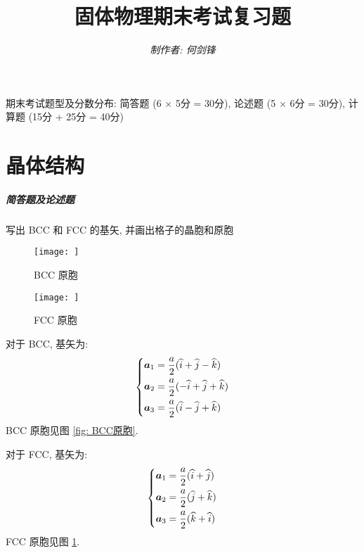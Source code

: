 \documentclass[UTF8]{ctexart}
\title{\bfseries 固体物理期末考试复习题}
\author{\slshape 制作者: 何剑锋}
\date{}
\newenvironment{Answer}{}{}
\begin{document}
\maketitle

\hspace*{2em}期末考试题型及分数分布: 简答题 (6 $\times$ 5分 = 30分), 论述题 (5 $\times$ 6分 = 30分), 计算题 (15分 + 25分 = 40分)

\section{晶体结构}
    \subparagraph{简答题及论述题}
        \begin{Question}
            \item 写出 BCC 和 FCC 的基矢, 并画出格子的晶胞和原胞

\begin{Answer}
    \begin{Solve}[Solve:]
        \begin{figure}
            \centering
            \parbox[t]{.49\textwidth}{
                \centering
                \texttt{[image: ]}
                \caption{BCC 原胞}\label{fig: BCC原胞}
            }
            \parbox[t]{.49\textwidth}{
                \centering
                \texttt{[image: ]}
                \caption{FCC 原胞}\label{fig: FCC原胞}
            }
        \end{figure}

        \hspace*{2em}对于 BCC, 基矢为:
            \begin{equation*}
                \begin{dcases}
                    \bm{a}_1 = \dfrac{a}{2} (\widehat{i} + \widehat{j} - \widehat{k})  \\
                    \bm{a}_2 = \dfrac{a}{2} (-\widehat{i} + \widehat{j} + \widehat{k}) \\
                    \bm{a}_3 = \dfrac{a}{2} (\widehat{i} - \widehat{j} + \widehat{k})
                \end{dcases}
            \end{equation*}
        BCC 原胞见图 \ref{fig: BCC原胞}.

        \hspace*{2em}对于 FCC, 基矢为:
            \begin{equation*}
                \begin{dcases}
                    \bm{a}_1 = \dfrac{a}{2} (\widehat{i} + \widehat{j}) \\
                    \bm{a}_2 = \dfrac{a}{2} (\widehat{j} + \widehat{k}) \\
                    \bm{a}_3 = \dfrac{a}{2} (\widehat{k} + \widehat{i})
                \end{dcases}
            \end{equation*}
        FCC 原胞见图 \ref{fig: FCC原胞}.
    \end{Solve}
\end{Answer}


\end{Question}
\end{document}
